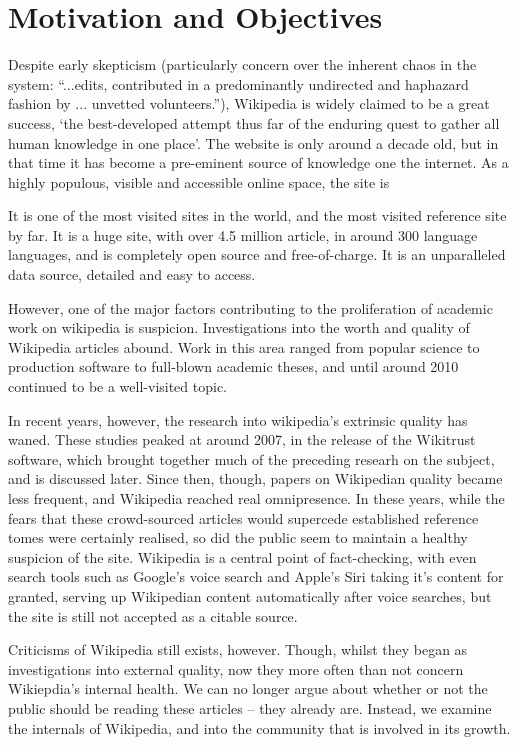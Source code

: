 \section{Motivation and Objectives}

Despite early skepticism (particularly concern over the inherent chaos
in the system: ``...edits, contributed in a predominantly undirected
and haphazard fashion by ... unvetted
volunteers.''\cite{Wilkinson2007}), Wikipedia is widely claimed to be
a great success, `the best-developed attempt thus far of the enduring
quest to gather all human knowledge in one
place'\cite{Mesgari2014}. The website is only around a decade old, but
in that time it has become a pre-eminent source of knowledge one the
internet. As a highly populous, visible and accessible online space,
the site is 

It is one of the most visited sites in the world, and the
most visited reference site by far. It is a huge site, with over 4.5
million article, in around 300 language languages, and is completely
open source and free-of-charge. It is an unparalleled data source,
detailed and easy to access.

However, one of the major factors contributing to the proliferation of
academic work on wikipedia is suspicion. Investigations into the worth
and quality of Wikipedia articles abound. Work in this area ranged
from popular science to production software to full-blown academic
theses, and until around 2010 continued to be a well-visited topic.

In recent years, however, the research into wikipedia's extrinsic
quality has waned. These studies peaked at around 2007, in the release
of the Wikitrust software, which brought together much of the
preceding researh on the subject, and is discussed later. Since then,
though, papers on Wikipedian quality became less frequent, and
Wikipedia reached real omnipresence.  In these years, while the fears
that these crowd-sourced articles would supercede established
reference tomes were certainly realised, so did the public seem to
maintain a healthy suspicion of the site. Wikipedia is a central point
of fact-checking, with even search tools such as Google's voice search
and Apple's Siri taking it's content for granted, serving up
Wikipedian content automatically after voice searches, but the site is
still not accepted as a citable source.

Criticisms of Wikipedia still exists, however. Though, whilst they
began as investigations into external quality, now they more often
than not concern Wikiepdia's internal health. We can no longer argue
about whether or not the public should be reading these articles --
they already are. Instead, we examine the internals of Wikipedia, and
into the community that is involved in its growth. 

